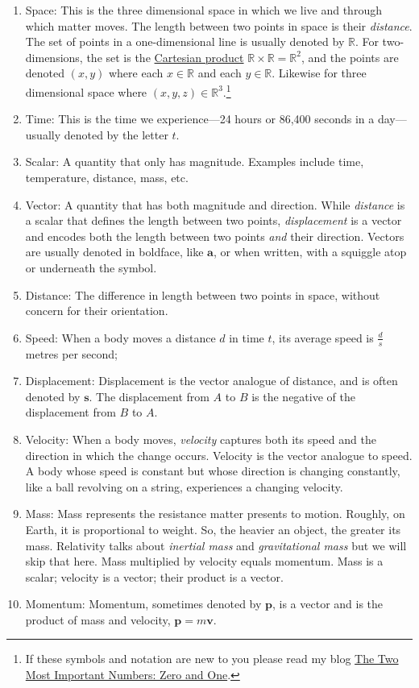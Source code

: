\documentclass[
  a4paper,
]{article}
\begin{document}
\begin{enumerate}
\item
  Space: This is the three dimensional space in which we live and
  through which matter moves. The length between two points in space is
  their \emph{distance}. The set of points in a one-dimensional line is
  usually denoted by \(\mathbb{R}\). For two-dimensions, the set is the
  \href{https://en.wikipedia.org/wiki/Cartesian_product}{Cartesian
  product} \(\mathbb{R} \times \mathbb{R} = \mathbb{R}^2\), and the
  points are denoted \((x, y)\) where each \(x \in \mathbb{R}\) and each
  \(y \in \mathbb{R}\). Likewise for three dimensional space where
  \((x, y, z) \in \mathbb{R}^3\).\footnote{If these symbols and notation
    are new to you please read my blog
    \href{https://swanlotus.netlify.app/blogs/the-two-most-important-numbers-zero-and-one}{The
    Two Most Important Numbers: Zero and One}.}
\item
  Time: This is the time we experience---24 hours or 86,400 seconds in a
  day---usually denoted by the letter \(t\).
\item
  Scalar: A quantity that only has magnitude. Examples include time,
  temperature, distance, mass, etc.
\item
  Vector: A quantity that has both magnitude and direction. While
  \emph{distance} is a scalar that defines the length between two
  points, \emph{displacement} is a vector and encodes both the length
  between two points \emph{and} their direction. Vectors are usually
  denoted in boldface, like \(\mathbf{a}\), or when written, with a
  squiggle atop or underneath the symbol.
\item
  Distance: The difference in length between two points in space,
  without concern for their orientation.
\item
  Speed: When a body moves a distance \(d\) in time \(t\), its average
  speed is \(\frac{d}{s}\) metres per second;
\item
  Displacement: Displacement is the vector analogue of distance, and is
  often denoted by \(\mathbf{s}\). The displacement from \(A\) to \(B\)
  is the negative of the displacement from \(B\) to \(A\).
\item
  Velocity: When a body moves, \emph{velocity} captures both its speed
  and the direction in which the change occurs. Velocity is the vector
  analogue to speed. A body whose speed is constant but whose direction
  is changing constantly, like a ball revolving on a string, experiences
  a changing velocity.
\item
  Mass: Mass represents the resistance matter presents to motion.
  Roughly, on Earth, it is proportional to weight. So, the heavier an
  object, the greater its mass. Relativity talks about \emph{inertial
  mass} and \emph{gravitational mass} but we will skip that here. Mass
  multiplied by velocity equals momentum. Mass is a scalar; velocity is
  a vector; their product is a vector.
\item
  Momentum: Momentum, sometimes denoted by \(\mathbf{p}\), is a vector
  and is the product of mass and velocity, \(\mathbf{p} = m\mathbf{v}\).
\end{enumerate}
\end{document}
